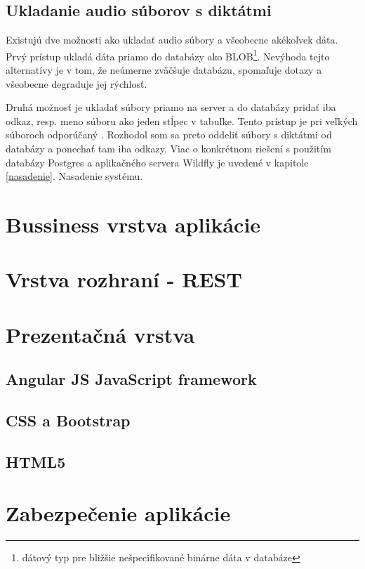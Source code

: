 \documentclass[12pt,oneside]{fithesis2}
\begin{document}
      \subsection{Ukladanie audio súborov s diktátmi} \label{ukladanie}
      \par Existujú dve možnosti ako ukladať audio súbory a všeobecne akékoľvek dáta. Prvý prístup ukladá dáta priamo do databázy ako BLOB\footnote{dátový typ pre bližšie nešpecifikované binárne dáta v databáze}. Nevýhoda tejto alternatívy je v tom, že neúmerne zväčšuje databázu, spomaľuje dotazy a všeobecne degraduje jej rýchlosť.
      \par Druhá možnosť je ukladať súbory priamo na server a do databázy pridať iba odkaz, resp. meno súboru ako jeden stĺpec v tabuľke. Tento prístup je pri veľkých súboroch odporúčaný \cite{sof1}. Rozhodol som sa preto oddeliť súbory s diktátmi od databázy a ponechať tam iba odkazy. Viac o konkrétnom riešení s použitím databázy Postgres a aplikačného servera Wildfly je uvedené v kapitole \ref{nasadenie}. Nasadenie systému.
      \section{Bussiness vrstva aplikácie}
      \section{Vrstva rozhraní - REST}
      \section{Prezentačná vrstva}
      		\subsection{Angular JS JavaScript framework}
      		\subsection{CSS a Bootstrap}
      		\subsection{HTML5}
      		\pagebreak
      \section{Zabezpečenie aplikácie}
\end{document}
